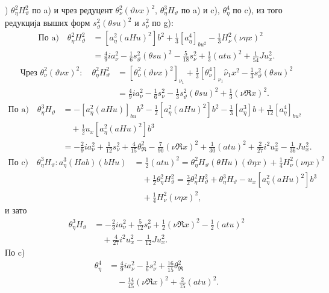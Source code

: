 ﻿\documentclass[11pt]{article}
\newcommand{\R}{\mathfrak R}
\begin{document}
) $\theta_\eta^2H_\vartheta^2$ по \mbox{a)} и чрез редуцент $\theta_\nu^2(\vartheta\nu x)^2$, $\theta_\eta^3H_\vartheta$ по \mbox{a)} и \mbox{c)}, $\theta_\eta^4$ по \mbox{c)}, из того редукција выших форм $s_\vartheta^2(\theta su)^2$ и $s_\nu^2$ по \mbox{g)}:
\begingroup\scriptsize
\[
\begin{aligned}
\text{По }\mathrm{a)}\quad
\theta_\eta^2H_\vartheta^2&=[a_\eta^2(aHu)^2]b^2+\frac13[a_\eta^4]_{bu^2}-\frac13H_\nu^2(\nu\eta x)^2\\
&=\frac49ia_\nu^2-\frac16s_\vartheta^2(\theta su)^2-\frac5{18}s_\nu^2+\frac13(atu)^2+\frac1{54}Ju_x^2.
\end{aligned}
\]
\[
\begin{aligned}
\text{Чрез }\theta_\nu^2(\vartheta\nu x)^2:
\quad\theta_\eta^2H_\vartheta^2
&=[\theta_\nu^2(\vartheta\nu x)^2]_{\nu_1}+\frac13[\theta_\nu^4]_{\nu_1}\hat\nu_1x^2-\frac13s_\vartheta^2(\theta su)^2\\
&=\frac49ia_\nu^2-\frac16s_\nu^2-\frac13s_\vartheta^2(\theta su)^2+\frac13(\nu\R x)^2.
\end{aligned}
\]
\[
\begin{aligned}
\text{По }\mathrm{a)}\quad
\theta_\eta^3H_\vartheta&=-[a_\eta^2(aHu)]_{bu}b^2-\frac12[a_\eta^2(aHu)^2]b^2-\frac13[a_\eta^3]b+\frac1{12}[a_\eta^4]_{bu^2}\\
&\quad+\frac12u_x[a_\eta^2(aHu)^2]b^3\\
&=-\frac29ia_\nu^2+\frac1{12}s_\nu^2+\frac4{15}\theta_\R^2-\frac7{90}(\nu\R x)^2+\frac1{30}(atu)^2+\frac2{27}i^2u_x^2-\frac1{36}Ju_x^2.
\end{aligned}
\]
\[
\begin{aligned}
\text{По }\mathrm{c)}\quad
\theta_\eta^3H_\vartheta:
 a_\eta^3(Hab)(bHu)&=\frac12(atu)^2
=\theta_\eta^2H_\vartheta(\theta Hu)(\vartheta\eta x)+\frac14H_\nu^2(\nu\eta x)^2\\
&\quad+\frac12\theta_\eta^2H_\vartheta^2
=\frac32\theta_\eta^2H_\vartheta^2+\theta_\eta^3H_\vartheta-u_x[a_\eta^2(aHu)^2]b^3\\
&\quad+\frac14H_\nu^2(\nu\eta x)^2,
\end{aligned}
\]
\endgroup
и зато
\begingroup\small
\[
\begin{aligned}
\theta_\eta^3H_\vartheta&=-\frac23ia_\nu^2+\frac5{12}s_\nu^2+\frac12(\nu\R x)^2-\frac12(atu)^2\\
&\quad+\frac4{27}i^2u_x^2-\frac1{12}Ju_x^2.
\end{aligned}
\]
По \mbox{c)}
\[
\begin{aligned}
\theta_\eta^4&=\frac49ia_\nu^2-\frac16s_\nu^2+\frac{16}{15}\theta_\R^2\\
&\quad-\frac{14}{45}(\nu\R x)^2+\frac2{15}(atu)^2.
\end{aligned}
\]
\end{document}
